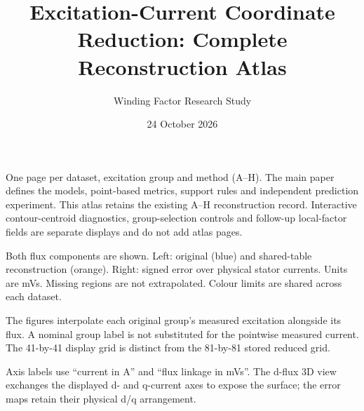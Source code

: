 \documentclass[11pt,a4paper]{article}
\title{Excitation-Current Coordinate Reduction: Complete Reconstruction Atlas}
\author{Winding Factor Research Study}\date{24 October 2026}
\begin{document}
\maketitle
One page per dataset, excitation group and method (A--H). The main paper defines the models, point-based metrics, support rules and independent prediction experiment.
This atlas retains the existing A--H reconstruction record. Interactive contour-centroid diagnostics, group-selection controls and follow-up local-factor fields are separate displays and do not add atlas pages.
\par\medskip
Both flux components are shown. Left: original (blue) and shared-table reconstruction (orange). Right: signed error over physical stator currents. Units are mVs. Missing regions are not extrapolated. Colour limits are shared across each dataset.
\par\medskip
The figures interpolate each original group's measured excitation alongside its flux. A nominal group label is not substituted for the pointwise measured current. The 41-by-41 display grid is distinct from the 81-by-81 stored reduced grid.
\par\medskip
Axis labels use ``current in A'' and ``flux linkage in mVs''. The d-flux 3D view exchanges the displayed d- and q-current axes to expose the surface; the error maps retain their physical d/q arrangement.
\centering

\end{document}
